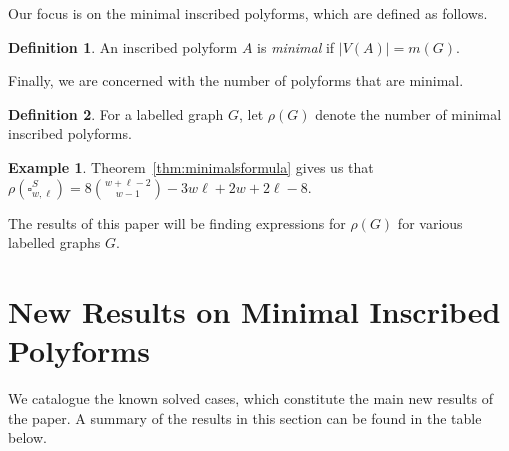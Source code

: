 \documentclass[12pt]{article}
\theoremstyle{plain}
\theoremstyle{definition}
\theoremstyle{remark}
\theoremstyle{definition}
\newtheorem{definition}{Definition}[section]
\newtheorem{exmp}{Example}[section]
\begin{document}
Our focus is on the minimal inscribed polyforms, which are defined as follows.

\begin{definition}\label{def:minscribedpolyform}
    An inscribed polyform $A$ is \textit{minimal} if $|V(A)| = m(G)$.  
\end{definition}

Finally, we are concerned with the number of polyforms that are minimal. 

\begin{definition}
    For a labelled graph $G$, let $\rho(G)$ denote the number of minimal inscribed polyforms.
\end{definition}

\begin{exmp}
Theorem~\ref{thm:minimalsformula} gives us that $\rho(\square^S_{w,\ell}) = 8\binom{w+\ell-2}{w-1} -3w\ell + 2w +2\ell-8$.
\end{exmp}

The results of this paper will be finding expressions for $\rho(G)$ for various labelled graphs $G$.
\section{New Results on Minimal Inscribed Polyforms}\label{sec:solved}

We catalogue the known solved cases, which constitute the main new results of the paper. A summary of the results in this section can be found in the table below. %
\end{document}
